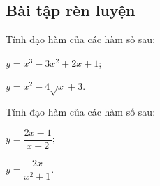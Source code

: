 \subsection{Bài tập rèn luyện}
\begin{bt}%
Tính đạo hàm của các hàm số sau:
\begin{listEX}[2]
	\item $y=x^3-3x^2+2x+1$;
	\item $y=x^2-4\sqrt{x}+3$.
\end{listEX}
\end{bt}
\begin{bt}%
Tính đạo hàm của các hàm số sau:
\begin{listEX}[2]
	\item $y=\dfrac{2x-1}{x+2}$;
	\item $y=\dfrac{2x}{x^2+1}$.
\end{listEX}
\end{bt}

